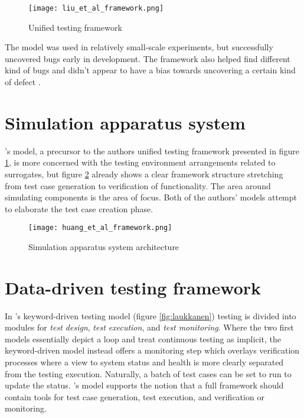 \documentclass[12pt,a4paper,oneside,pdftex]{report}
\begin{document}
\begin{figure}[H]
  \begin{center}
    \texttt{[image: liu\_et\_al\_framework.png]}
    \caption{Unified testing framework \citep{liu2009unified}}
    \label{fig:liu}
  \end{center}
\end{figure}

The model was used in relatively small-scale experiments, but successfully uncovered bugs early in development. The framework also helped find different kind of bugs and didn't appear to have a bias towards uncovering a certain kind of defect \citep{liu2009unified}.

\section{Simulation apparatus system}

\citeauthor{huang2008surrogate}'s \citeyearpar{huang2008surrogate} model, a precursor to the authors unified testing framework presented in figure \ref{fig:liu}, is more concerned with the testing environment arrangements related to surrogates, but figure \ref{fig:huang} already shows a clear framework structure stretching from test case generation to verification of functionality. The area around simulating components is the area of focus. Both of the authors' models attempt to elaborate the test case creation phase. \citep{huang2008surrogate}

\begin{figure}[H]
  \begin{center}
    \texttt{[image: huang\_et\_al\_framework.png]}
    \caption{Simulation apparatus system architecture \citep{huang2008surrogate}}
    \label{fig:huang}
  \end{center}
\end{figure}

\section{Data-driven testing framework}

In \citeauthor{laukkanen2006data}'s \citeyearpar{laukkanen2006data} keyword-driven testing model (figure \ref{fig:laukkanen}) testing is divided into modules for \emph{test design}, \emph{test execution}, and \emph{test monitoring}. Where the two first models essentially depict a loop and treat continuous testing as implicit, the keyword-driven model instead offers a monitoring step which overlays verification processes where a view to system status and health is more clearly separated from the testing execution. Naturally, a batch of test cases can be set to run to update the status. \citeauthor{laukkanen2006data}'s \citeyearpar{laukkanen2006data} model supports the notion that a full framework should contain tools for test case generation, test execution, and verification or monitoring.
\end{document}
